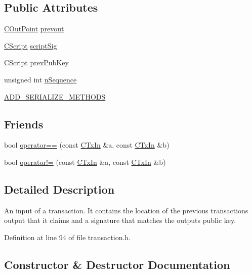 \subsection*{Public Attributes}
\begin{DoxyCompactItemize}
\item 
\hyperlink{class_c_out_point}{C\+Out\+Point} \hyperlink{class_c_tx_in_aed9312051a25380cbd7f123408ab7c20}{prevout}
\item 
\hyperlink{class_c_script}{C\+Script} \hyperlink{class_c_tx_in_aba540fd902366210a6ad6cd9a18fe763}{script\+Sig}
\item 
\hyperlink{class_c_script}{C\+Script} \hyperlink{class_c_tx_in_a91732c5ffb13520a6989b162ff6683fc}{prev\+Pub\+Key}
\item 
unsigned int \hyperlink{class_c_tx_in_aa0dd08a6ecd0a595d9ef4dad020c1ea5}{n\+Sequence}
\item 
\hyperlink{class_c_tx_in_aad2fd3fef5ad4ebe7e54c0db0cc34be4}{A\+D\+D\+\_\+\+S\+E\+R\+I\+A\+L\+I\+Z\+E\+\_\+\+M\+E\+T\+H\+O\+D\+S}
\end{DoxyCompactItemize}
\subsection*{Friends}
\begin{DoxyCompactItemize}
\item 
bool \hyperlink{class_c_tx_in_a1bb37c4cd8573c3014a194e8ce4d8daa}{operator==} (const \hyperlink{class_c_tx_in}{C\+Tx\+In} \&a, const \hyperlink{class_c_tx_in}{C\+Tx\+In} \&b)
\item 
bool \hyperlink{class_c_tx_in_a4188c5f0807185c03e80598a7a3ace72}{operator!=} (const \hyperlink{class_c_tx_in}{C\+Tx\+In} \&a, const \hyperlink{class_c_tx_in}{C\+Tx\+In} \&b)
\end{DoxyCompactItemize}


\subsection{Detailed Description}
An input of a transaction. It contains the location of the previous transaction\textquotesingle{}s output that it claims and a signature that matches the output\textquotesingle{}s public key. 

Definition at line 94 of file transaction.\+h.



\subsection{Constructor \& Destructor Documentation}
\hypertarget{class_c_tx_in_abcf9f5a65b0a016b31912f4cd1f32c73}{}
